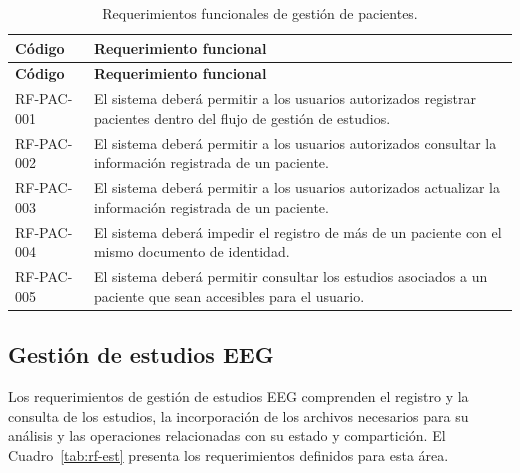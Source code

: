 \begin{longtable}{|p{}|p{}|}
    \caption{Requerimientos funcionales de gestión de pacientes.}
    \label{tab:rf-pac}\\
    \hline
    \textbf{Código} & \textbf{Requerimiento funcional} \\
    \hline
    \endfirsthead

    \hline
    \textbf{Código} & \textbf{Requerimiento funcional} \\
    \hline
    \endhead

    RF-PAC-001 &
    El sistema deberá permitir a los usuarios autorizados registrar pacientes
    dentro del flujo de gestión de estudios. \\
    \hline

    RF-PAC-002 &
    El sistema deberá permitir a los usuarios autorizados consultar la
    información registrada de un paciente. \\
    \hline

    RF-PAC-003 &
    El sistema deberá permitir a los usuarios autorizados actualizar la
    información registrada de un paciente. \\
    \hline

    RF-PAC-004 &
    El sistema deberá impedir el registro de más de un paciente con el mismo
    documento de identidad. \\
    \hline

    RF-PAC-005 &
    El sistema deberá permitir consultar los estudios asociados a un paciente
    que sean accesibles para el usuario. \\
    \hline
\end{longtable}


\subsection{Gestión de estudios EEG}
\label{subsec:rf-estudios}

Los requerimientos de gestión de estudios EEG comprenden el registro y la
consulta de los estudios, la incorporación de los archivos necesarios para
su análisis y las operaciones relacionadas con su estado y compartición.
El Cuadro~\ref{tab:rf-est} presenta los requerimientos definidos para esta
área.

